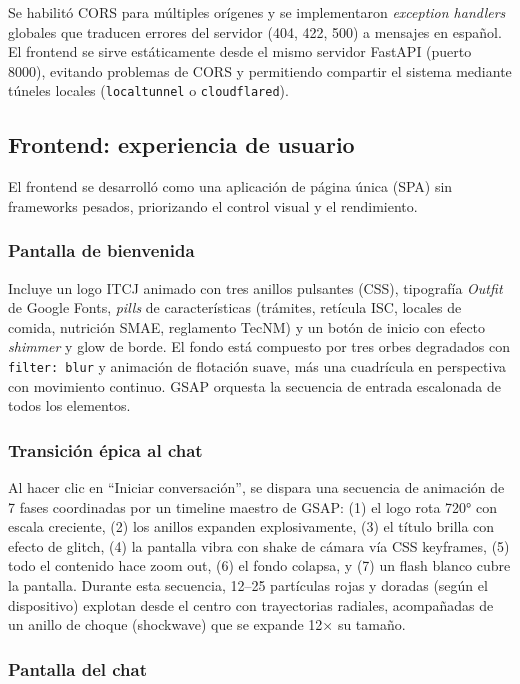 Se habilitó CORS para múltiples orígenes y se implementaron \textit{exception handlers} globales que traducen errores del servidor (404, 422, 500) a mensajes en español. El frontend se sirve estáticamente desde el mismo servidor FastAPI (puerto 8000), evitando problemas de CORS y permitiendo compartir el sistema mediante túneles locales (\texttt{localtunnel} o \texttt{cloudflared}).

\subsection{Frontend: experiencia de usuario}

El frontend se desarrolló como una aplicación de página única (SPA) sin frameworks pesados, priorizando el control visual y el rendimiento.

\subsubsection{Pantalla de bienvenida}

Incluye un logo ITCJ animado con tres anillos pulsantes (CSS), tipografía \textit{Outfit} de Google Fonts, \textit{pills} de características (trámites, retícula ISC, locales de comida, nutrición SMAE, reglamento TecNM) y un botón de inicio con efecto \textit{shimmer} y glow de borde. El fondo está compuesto por tres orbes degradados con \texttt{filter: blur} y animación de flotación suave, más una cuadrícula en perspectiva con movimiento continuo. GSAP orquesta la secuencia de entrada escalonada de todos los elementos.

\subsubsection{Transición épica al chat}

Al hacer clic en ``Iniciar conversación'', se dispara una secuencia de animación de 7 fases coordinadas por un timeline maestro de GSAP: (1) el logo rota 720° con escala creciente, (2) los anillos expanden explosivamente, (3) el título brilla con efecto de glitch, (4) la pantalla vibra con shake de cámara vía CSS keyframes, (5) todo el contenido hace zoom out, (6) el fondo colapsa, y (7) un flash blanco cubre la pantalla. Durante esta secuencia, 12--25 partículas rojas y doradas (según el dispositivo) explotan desde el centro con trayectorias radiales, acompañadas de un anillo de choque (shockwave) que se expande 12× su tamaño.

\subsubsection{Pantalla del chat}

